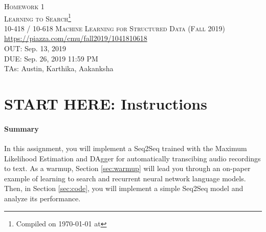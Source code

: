 \documentclass[11pt,addpoints,answers]{exam}
\title{\textsc{\hwName}} %
\date{}
\date{}
\numberwithin{equation}{section} %
\numberwithin{figure}{section} %
\numberwithin{table}{section} %
\newcommand{\courseNum}{10-418 / 10-618}
\newcommand{\courseName}{Machine Learning for Structured Data}
\newcommand{\courseSem}{Fall 2019}
\newcommand{\piazzaUrl}{\url{https://piazza.com/cmu/fall2019/1041810618}}
\newcommand{\hwNum}{Homework 1}
\newcommand{\hwTopic}{Learning to Search}
\newcommand{\outDate}{Sep. 13, 2019}
\newcommand{\dueDate}{Sep. 26, 2019 11:59 PM}
\newcommand{\taNames}{Austin, Karthika, Aakanksha}
\begin{document}
\section*{}
\begin{center}
  \textsc{\LARGE \hwNum} \\
  \textsc{\LARGE \hwTopic\footnote{Compiled on \today{} at \currenttime{}}} \\
  \vspace{1em}
  \textsc{\large \courseNum{} \courseName{} (\courseSem)} \\
  \piazzaUrl\\
  \vspace{1em}
  OUT: \outDate \\
  DUE: \dueDate \\
  TAs: \taNames
\end{center}


\section*{START HERE: Instructions}

\begin{notebox}
\paragraph{Summary} In this assignment, you will implement a Seq2Seq trained with the Maximum Likelihood Estimation and DAgger for automatically transcibing audio recordings to text. As a warmup, Section \ref{sec:warmup} will lead you through an on-paper example of learning to search and recurrent neural network language models. Then, in Section \ref{sec:code}, you will implement a simple Seq2Seq model and analyze its performance.
\end{notebox}
\end{document}

